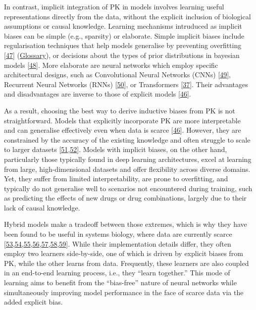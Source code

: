 In contrast, implicit integration of PK in models involves learning useful representations directly from the data, without the explicit inclusion of biological assumptions or causal knowledge.
Learning mechanisms intruduced as implicit biases can be simple (e.g., sparsity) or elaborate.
Simple implicit biases include regularisation techniques that help models generalise by preventing overfitting {[}\protect\hyperlink{ref-kX2zf6UE}{47}{]} (\protect\hyperlink{overfitting}{Glossary}), or decisions about the types of prior distributions in bayesian models {[}\protect\hyperlink{ref-cKqFMtL2}{48}{]}.
More elaborate are neural networks which employ specific architectural designs, such as Convolutional Neural Networks (CNNs) {[}\protect\hyperlink{ref-bZ3hxYDX}{49}{]}, Recurrent Neural Networks (RNNs) {[}\protect\hyperlink{ref-x4dbEYer}{50}{]}, or Transformers {[}\protect\hyperlink{ref-rh7nCPVE}{37}{]}.
Their advantages and disadvantages are inverse to those of explicit models {[}\protect\hyperlink{ref-xjVh8IQ5}{46}{]}.

As a result, choosing the best way to derive inductive biases from PK is not straightforward.
Models that explicitly incorporate PK are more interpretable and can generalise effectively even when data is scarce {[}\protect\hyperlink{ref-xjVh8IQ5}{46}{]}.
However, they are constrained by the accuracy of the existing knowledge and often struggle to scale to larger datasets {[}\protect\hyperlink{ref-6W1y3ZrT}{51},\protect\hyperlink{ref-OlEfQKqu}{52}{]}.
Models with implicit biases, on the other hand, particularly those typically found in deep learning architectures, excel at learning from large, high-dimensional datasets and offer flexibility across diverse domains.
Yet, they suffer from limited interpretability, are prone to overfitting, and typically do not generalise well to scenarios not encountered during training, such as predicting the effects of new drugs or drug combinations, largely due to their lack of causal knowledge.

Hybrid models make a tradeoff between those extremes, which is why they have been found to be useful in systems biology, where data are currently scarce {[}\protect\hyperlink{ref-bMaT0Vyc}{53},\protect\hyperlink{ref-KZ19R8ZY}{54},\protect\hyperlink{ref-aLhTIs9}{55},\protect\hyperlink{ref-4smautjA}{56},\protect\hyperlink{ref-YOm0bqVR}{57},\protect\hyperlink{ref-JkqcQgM7}{58},\protect\hyperlink{ref-1Xej0UJj}{59}{]}.
While their implementation details differ, they often employ two learners side-by-side, one of which is driven by explicit biases from PK, while the other learns from data.
Frequently, these learners are also coupled in an end-to-end learning process, i.e., they ``learn together.'' This mode of learning aims to benefit from the ``bias-free'' nature of neural networks while simultaneously improving model performance in the face of scarce data via the added explicit bias.

